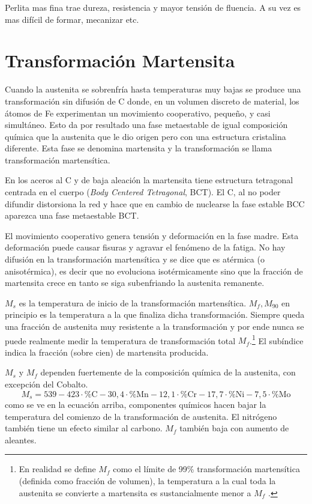 Perlita mas fina trae dureza, resistencia y mayor tensión de fluencia. A su vez es mas difícil de formar, mecanizar etc.

\section{Transformación Martensita}
Cuando la austenita se sobrenfría hasta temperaturas muy bajas se produce una transformación sin difusión de C donde, en un volumen discreto de material, los átomos de Fe experimentan un movimiento cooperativo, pequeño, y casi simultáneo. Esto da por resultado una fase metaestable de igual composición química que la austenita que le dio origen pero con una estructura cristalina diferente. Esta fase se denomina martensita y la transformación se llama transformación martensítica.

En los aceros al C y de baja aleación la martensita tiene estructura tetragonal centrada en el cuerpo (\textit{Body Centered Tetragonal}, BCT). El C, al no poder difundir distorsiona la red y hace que en cambio de nuclearse la fase estable BCC aparezca una fase metaestable BCT.

El movimiento cooperativo genera tensión y deformación en la fase madre. Esta deformación puede causar fisuras y agravar el fenómeno de la fatiga. No hay difusión en la transformación martensítica y se dice que es atérmica (o anisotérmica), es decir que no evoluciona isotérmicamente sino que la fracción de martensita crece en tanto se siga subenfriando la austenita remanente.

$M_s$ es la temperatura de inicio de la transformación martensítica. $M_f,M_{90}$ en principio es la temperatura a la que finaliza dicha transformación. Siempre queda una fracción de austenita muy resistente a la transformación y por ende nunca se puede realmente medir la temperatura de transformación total $M_f$.\footnote{En realidad se define $M_f$ como el límite de 99\% transformación martensítica (definida como fracción de volumen), la temperatura a la cual toda la austenita se convierte a martensita es sustancialmente menor a $M_f$ \cite{gottstein2013physical}.} El subíndice indica la fracción (sobre cien) de martensita producida.

$M_s$ y $M_f$ dependen fuertemente de la composición química de la austenita, con excepción del Cobalto.
\begin{equation} \label{eq:ms_martensite}
    M_s=539-423\cdot \% \mathrm{C}-30,4\cdot \% \mathrm{M n}-12,1\cdot \% \mathrm{Cr}-17,7\cdot \% \mathrm{Ni}-7,5\cdot \% \mathrm{Mo}
\end{equation}
como se ve en la ecuación arriba, componentes químicos hacen bajar la temperatura del comienzo de la transformación de austenita. El nitrógeno también tiene un efecto similar al carbono. $M_f$ también baja con aumento de aleantes.

